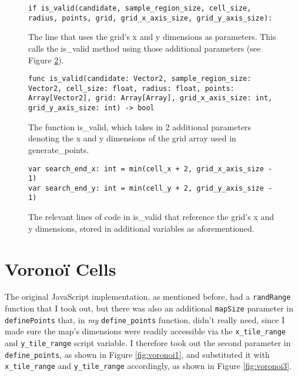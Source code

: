\begin{figure}[H]
    \centering
    \begin{lstlisting}
if is_valid(candidate, sample_region_size, cell_size, radius, points, grid, grid_x_axis_size, grid_y_axis_size):
    \end{lstlisting}
    \caption{The line that uses the grid's x and y dimensions as parameters. This calls the is\_valid method using those additional parameters (see Figure \ref{fig:pds4}).}
    \label{fig:pds3}
\end{figure}

\begin{figure}[H]
    \centering
    \begin{lstlisting}
func is_valid(candidate: Vector2, sample_region_size: Vector2, cell_size: float, radius: float, points: Array[Vector2], grid: Array[Array], grid_x_axis_size: int, grid_y_axis_size: int) -> bool
    \end{lstlisting}
    \caption{The function is\_valid, which takes in 2 additional parameters denoting the x and y dimensions of the grid array used in generate\_points.}
    \label{fig:pds4}
\end{figure}

\begin{figure}[H]
    \centering
    \begin{lstlisting}
var search_end_x: int = min(cell_x + 2, grid_x_axis_size - 1)
var search_end_y: int = min(cell_y + 2, grid_y_axis_size - 1)
    \end{lstlisting}
    \caption{The relevant lines of code in is\_valid that reference the grid's x and y dimensions, stored in additional variables as aforementioned.}
    \label{fig:pds5}
\end{figure}

\section{Voronoï Cells}

The original JavaScript implementation, as mentioned before, had a \verb|randRange| function that I took out, but there was also an additional \verb|mapSize| parameter in \verb|definePoints| that, in \textit{my} \verb|define_points| function, didn't really need, since I made sure the map's dimensions were readily accessible via the \verb|x_tile_range| and \verb|y_tile_range| script variable. I therefore took out the second parameter in \verb|define_points|, as shown in Figure \ref{fig:voronoi1}, and substituted it with \verb|x_tile_range| and \verb|y_tile_range| accordingly, as shown in Figure \ref{fig:voronoi3}.

